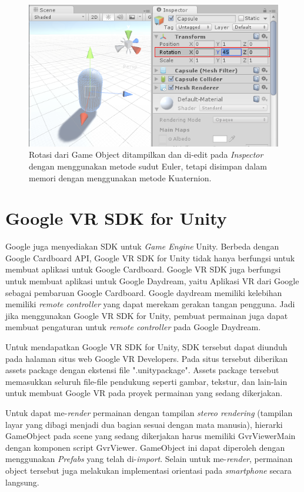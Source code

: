 \begin{figure}[htbp]
\centering
\includegraphics[scale=1]{Gambar/InspectorRotationEulerAngles.png}
\caption{Rotasi dari Game Object ditampilkan dan di-edit pada \textit{Inspector} dengan menggunakan metode sudut Euler, tetapi disimpan dalam memori dengan menggunakan metode Kuaternion.} 
\label{fig:InspectorRotationEulerAngles}
\end{figure}
 
 \section{Google VR SDK for Unity}
 \label{sec:google_vr_sdk_for_unity}
 
 Google juga menyediakan SDK untuk \textit{Game Engine} Unity. Berbeda dengan Google Cardboard API, Google VR SDK for Unity tidak hanya berfungsi untuk membuat aplikasi untuk Google Cardboard. Google VR SDK juga berfungsi untuk membuat aplikasi untuk Google Daydream, yaitu Aplikasi VR dari Google sebagai pembaruan Google Cardboard. Google daydream memiliki kelebihan memiliki \textit{remote controller} yang dapat merekam gerakan tangan pengguna. Jadi jika menggunakan Google VR SDK for Unity, pembuat permainan juga dapat membuat pengaturan untuk \textit{remote controller} pada Google Daydream.
 
 Untuk mendapatkan Google VR SDK for Unity, SDK tersebut dapat diunduh pada halaman situs web Google VR Developers. Pada situs tersebut diberikan assets package dengan ekstensi file ".unitypackage". Assets package tersebut memasukkan seluruh file-file pendukung seperti gambar, tekstur, dan lain-lain untuk membuat Google VR pada proyek permainan yang sedang dikerjakan. 
 
 Untuk dapat me-\textit{render} permainan dengan tampilan \textit{stereo rendering} (tampilan layar yang dibagi menjadi dua bagian sesuai dengan mata manusia), hierarki GameObject pada scene yang sedang dikerjakan harus memiliki GvrViewerMain dengan komponen script GvrViewer. GameObject ini dapat diperoleh dengan menggunakan \textit{Prefabs} yang telah di-\textit{import}. Selain untuk me-\textit{render}, permainan object tersebut juga melakukan implementasi orientasi pada \textit{smartphone} secara langsung.
 
